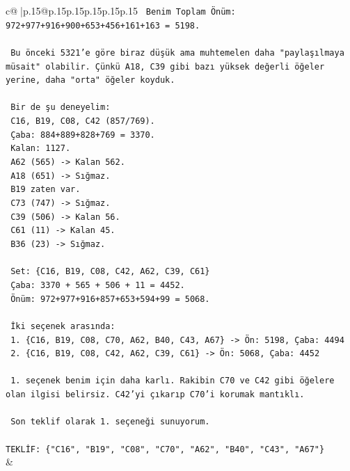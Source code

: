 \documentclass{article}
\begin{document}
{\begin{supertabular}{c@{$\;$}|p{.15\linewidth}@{}p{.15\linewidth}p{.15\linewidth}p{.15\linewidth}p{.15\linewidth}p{.15\linewidth}}
{{{\texttt{   Benim Toplam Önüm: 972+977+916+900+653+456+161+163 = 5198.} \\
\\ 
\texttt{   Bu önceki 5321'e göre biraz düşük ama muhtemelen daha "paylaşılmaya müsait" olabilir. Çünkü A18, C39 gibi bazı yüksek değerli öğeler yerine, daha "orta" öğeler koyduk.} \\
\\ 
\texttt{   Bir de şu deneyelim:} \\
\texttt{   C16, B19, C08, C42 (857/769).} \\
\texttt{   Çaba: 884+889+828+769 = 3370.} \\
\texttt{   Kalan: 1127.} \\
\texttt{   A62 (565) {-}> Kalan 562.} \\
\texttt{   A18 (651) {-}> Sığmaz.} \\
\texttt{   B19 zaten var.} \\
\texttt{   C73 (747) {-}> Sığmaz.} \\
\texttt{   C39 (506) {-}> Kalan 56.} \\
\texttt{   C61 (11) {-}> Kalan 45.} \\
\texttt{   B36 (23) {-}> Sığmaz.} \\
\\ 
\texttt{   Set: \{C16, B19, C08, C42, A62, C39, C61\}} \\
\texttt{   Çaba: 3370 + 565 + 506 + 11 = 4452.} \\
\texttt{   Önüm: 972+977+916+857+653+594+99 = 5068.} \\
\\ 
\texttt{   İki seçenek arasında:} \\
\texttt{   1. \{C16, B19, C08, C70, A62, B40, C43, A67\} {-}> Ön: 5198, Çaba: 4494} \\
\texttt{   2. \{C16, B19, C08, C42, A62, C39, C61\} {-}> Ön: 5068, Çaba: 4452} \\
\\ 
\texttt{   1. seçenek benim için daha karlı. Rakibin C70 ve C42 gibi öğelere olan ilgisi belirsiz. C42'yi çıkarıp C70'i korumak mantıklı.} \\
\\ 
\texttt{   Son teklif olarak 1. seçeneği sunuyorum.} \\
\\ 
\texttt{TEKLİF: \{"C16", "B19", "C08", "C70", "A62", "B40", "C43", "A67"\}} \\
            }
        }
    }
    & \\ \\


\end{supertabular}}
\end{document}
